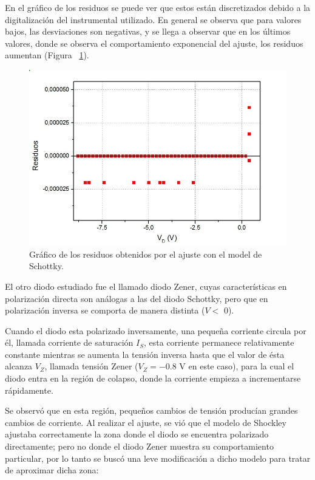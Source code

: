 \documentclass[twoside,twocolumn,a4paper]{article}
\begin{document}
En el gr\'afico de los residuos se puede ver que estos est\'an discretizados debido a la digitalizaci\'on del instrumental utilizado. En general se observa que para valores bajos, las desviaciones son negativas, y se llega a observar que en los \'ultimos valores, donde se observa el comportamiento exponencial del ajuste, los residuos aumentan (Figura ~\ref{fig:res}).

\begin{figure}[H]
\includegraphics[width=\linewidth]{residuos.jpg}
\captionsetup{justification=centering}
\caption{Gr\'afico de los residuos obtenidos por el ajuste con el model de Schottky.}
\label{fig:res}
\end{figure} 

El otro diodo estudiado fue el llamado diodo Zener, cuyas caracter\'isticas en polarizaci\'on directa son an\'alogas a las del diodo Schottky, pero que en polarizaci\'on inversa se comporta de manera distinta ($V <$ 0).


Cuando el diodo esta polarizado inversamente, una peque\~na corriente circula por \'el, llamada corriente de saturaci\'on $I_{S}$, esta corriente permanece relativamente constante mientras se aumenta la tensi\'on inversa hasta que el valor de \'esta alcanza $V_{Z}$, llamada tensi\'on Zener ($V_{Z} = - 0.8$ V en este caso), para la cual el diodo entra en la regi\'on de colapso, donde la corriente empieza a incrementarse r\'apidamente.

Se observ\'o que en esta regi\'on, peque\~nos cambios de tensi\'on produc\'ian grandes cambios de corriente. Al realizar el ajuste, se vi\'o que el modelo de Shockley ajustaba correctamente la zona donde el diodo se encuentra polarizado directamente; pero no donde el diodo Zener muestra su comportamiento particular, por lo tanto se busc\'o una leve modificaci\'on a dicho modelo \cite{shockley2} para tratar de aproximar dicha zona:
\end{document}
